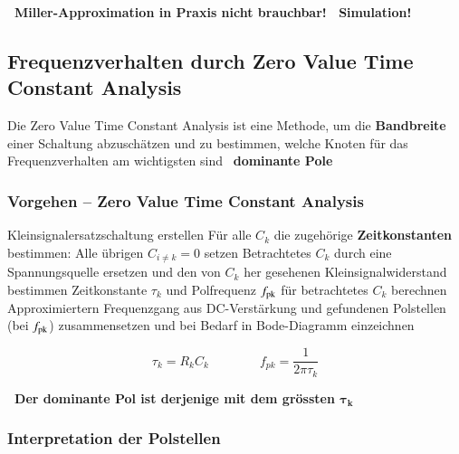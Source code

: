 \smallskip

\textbf{ \textrightarrow\ Miller-Approximation in Praxis nicht brauchbar! \textrightarrow\ Simulation! }



\subsection{Frequenzverhalten durch Zero Value Time Constant Analysis}

Die Zero Value Time Constant Analysis ist eine Methode, um die \textbf{Bandbreite} einer Schaltung abzuschätzen und zu bestimmen, welche Knoten für das Frequenzverhalten am wichtigsten sind \textrightarrow\ \textbf{dominante Pole}


\subsubsection{Vorgehen -- Zero Value Time Constant Analysis}

{
\renewcommand{\outlinei}{enumerate}
\renewcommand{\outlineii}{enumerate}
\begin{outline}
    \1 Kleinsignalersatzschaltung erstellen
    \1 Für alle $C_k$ die zugehörige \textbf{Zeitkonstanten} bestimmen:
        \2 Alle übrigen $C_{i \neq k} = 0$ setzen
        \2 Betrachtetes $C_k$ durch eine Spannungsquelle ersetzen und den von $C_k$ her gesehenen Kleinsignalwiderstand bestimmen
        \2 Zeitkonstante $\tau_k$ und Polfrequenz $f_{\rm pk}$ für betrachtetes $C_k$ berechnen
    \1 Approximiertern Frequenzgang aus DC-Verstärkung und gefundenen Polstellen \\
        (bei $f_{\rm pk}$) zusammensetzen und bei Bedarf in Bode-Diagramm einzeichnen
\end{outline}
}

$$ \tau_k = R_k C_k \qquad \qquad f_{pk} = \frac{1}{2 \pi \tau_k} $$

\textbf{ \textrightarrow\ Der dominante Pol ist derjenige mit dem grössten $\bm{\tau_k}$}


\subsubsection{Interpretation der Polstellen}

